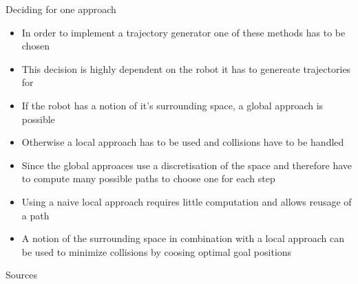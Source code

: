 \documentclass[11pt]{beamer}
\begin{document}
\begin{frame}{Deciding for one approach}
\begin{itemize}
\item In order to implement a trajectory generator one of these methods has to be chosen
\item This decision is highly dependent on the robot it has to genereate trajectories for
\item If the robot has a notion of it's surrounding space, a global approach is possible
\item Otherwise a local approach has to be used and collisions have to be handled
\item Since the global approaces use a discretisation of the space and therefore have to compute many possible paths to choose one for each step
\item Using a naive local approach requires little computation and allows reusage of a path 
\item A notion of the surrounding space in combination with a local approach can be used to minimize collisions by coosing optimal goal positions

\end{itemize}
\end{frame}

\begin{frame}{Sources}
\printbibliography[title={Sources},heading=bibintoc]
\end{frame}
\end{document}
